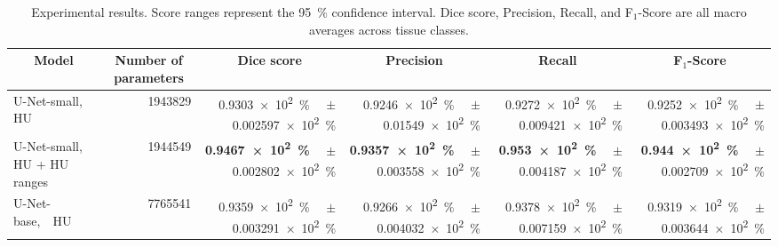 \documentclass[conference]{IEEEtran}
\newcommand\formatpercentage[2][round-precision = 1]{%
    \SI[round-mode = places,
        scientific-notation = fixed, fixed-exponent = 0,
        output-decimal-marker={.}, #1]{#2e2}{\percent}%
}
\newcommand\formatpercentagebold[2][round-precision = 1]{%
    \textbf{\SI[round-mode = places,
        scientific-notation = fixed, fixed-exponent = 0,
        output-decimal-marker={.}, #1]{#2e2}{\percent}}%
}
\begin{document}
%
\begin{table}[t]
    \caption{Experimental results. Score ranges represent the \SI{95}{\percent} confidence interval. Dice score, Precision, Recall, and F$_1$-Score are all macro averages across tissue classes.}
    \centering
    \begin{tabular}{lrrrrr}
        \toprule
        \multicolumn{1}{c}{\textbf{Model}} 
        & \multicolumn{1}{c}{\textbf{Number of parameters}} 
        & \multicolumn{1}{c}{\textbf{Dice score}} 
        & \multicolumn{1}{c}{\textbf{Precision}} 
        & \multicolumn{1}{c}{\textbf{Recall}} 
        & \multicolumn{1}{c}{\textbf{F$_1$-Score}} \\
        \midrule
        U-Net-small, HU                                   
        & \num{1943829} 
        &  \hspace{15pt} \formatpercentage{0.9303}\ \ $\pm$\formatpercentage{0.002597}
        &  \hspace{5pt} \formatpercentage{0.9246}\ \ $\pm$\formatpercentage{0.01549}
        &  \hspace{5pt} \formatpercentage{0.9272}\ \ $\pm$\formatpercentage{0.009421} 
        &  \hspace{5pt} \formatpercentage{0.9252}\ \ $\pm$\formatpercentage{0.003493} \\
        U-Net-small, HU + HU ranges                       
        & \num{1944549} 
        & \formatpercentagebold{0.9467}\ \ $\pm$\formatpercentage{0.002802} 
        & \formatpercentagebold{0.9357}\ \ $\pm$\formatpercentage{0.003558} 
        & \formatpercentagebold{0.953}\ \ $\pm$\formatpercentage{0.004187} 
        & \formatpercentagebold{0.944}\ \ $\pm$\formatpercentage{0.002709} \\
        \midrule
        U-Net-base,\ \ HU                                    
        & \num{7765541}
        & \formatpercentage{0.9359}\ \ $\pm$\formatpercentage{0.003291} 
        & \formatpercentage{0.9266}\ \ $\pm$\formatpercentage{0.004032} 
        & \formatpercentage{0.9378}\ \ $\pm$\formatpercentage{0.007159} 
        & \formatpercentage{0.9319}\ \ $\pm$\formatpercentage{0.003644} \\

\end{tabular}
\end{table}
\end{document}
